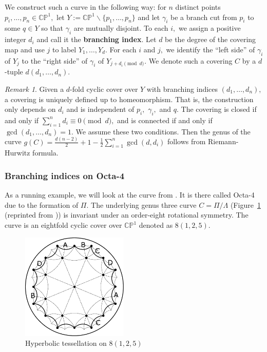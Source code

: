 \documentclass[12pt,reqno]{amsart}
\theoremstyle{definition}
\theoremstyle{remark}
\newtheorem*{remark}{Remark}
\begin{document}
We construct such a curve in the following way: for $n$ distinct points $p_i, \ldots , p_n \in \mathbb{C}\mathbb{P}^1,$ let $Y := \mathbb{C}\mathbb{P}^1 \backslash \{p_1, \ldots, p_n\}$ and let $\gamma_i$ be a branch cut from $p_i$ to some $q \in Y$ so that $\gamma_i$ are mutually disjoint. To each $i,$ we assign a positive integer $d_i$ and call it the \textbf{branching index}. Let $d$ be the degree of the covering map and use $j$ to label $Y_1, \ldots , Y_d.$ For each $i$ and $j,$ we identify the ``left side'' of $\gamma_i$ of $Y_j$ to the ``right side'' of $\gamma_i$ of $Y_{j + d_i \pmod d}.$ We denote such a covering $C$ by a $d$-tuple $d (d_1, \ldots , d_n).$


\begin{remark} Given a $d$-fold cyclic cover over $Y$ with branching indices $(d_1, \ldots , d_n),$ a covering is uniquely defined up to homeomorphism. That is, the construction only depends on $d_i$ and is independent of $p_i,$ $\gamma_i,$ and $q.$ The covering is closed if and only if $\sum\limits_{i=1}^n d_i \equiv 0 \pmod d,$ and is connected if and only if $\gcd (d_1, \ldots, d_n) = 1.$ We assume these two conditions. Then the genus of the curve $g(C) = \frac{d (n-2)}{2} + 1 - \frac{1}{2} \sum\limits_{i=1}^n \gcd(d,d_i)$ follows from Riemann-Hurwitz formula. 
\end{remark}

\subsubsection*{Branching indices on Octa-4}
As a running example, we will look at the curve from \cite{dami}. It is there called Octa-4 due to the formation of $\Pi.$ The underlying genus three curve $C = \Pi / \Lambda$ (Figure~\ref{fig:125} (reprinted from \cite{dami})) is invariant under an order-eight rotational symmetry. The curve is an eightfold cyclic cover over $\mathbb{C}\mathbb{P}^1$ denoted as $8 (1, 2, 5).$

\begin{figure}[htbp] %
   \centering
   \includegraphics[width=2in]{figures/125_base_.pdf} 
	\caption{Hyperbolic tessellation on $8(1, 2, 5)$}
	\label{fig:125}
\end{figure}
\end{document}
